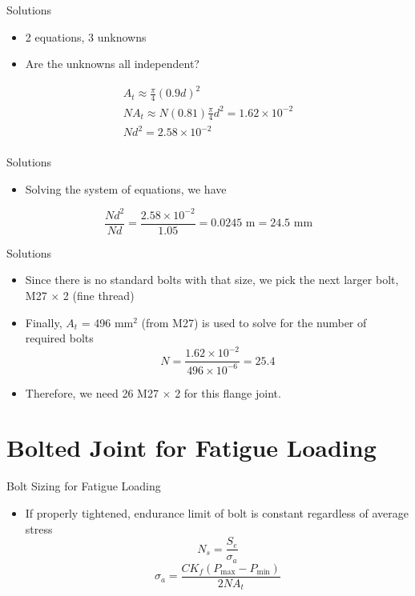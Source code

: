\documentclass[10pt, svgnames]{beamer}
\begin{document}
\begin{frame}[label={sec:org733d4e7}]{Solutions}
\begin{itemize}
  \item 2 equations, 3 unknowns
  \item Are the unknowns all independent?
  \end{itemize}
\[\begin{gathered}
    A_t \approx \frac{\pi}{4}\left(0.9d\right)^{2} \\
  NA_t \approx N(0.81)\frac{\pi}{4}{d^2} = 1.62 \times {10^{ - 2}} \\
  Nd^2 = 2.58 \times 10^{ - 2} \\
\end{gathered} \]
\end{frame}

\begin{frame}[label={sec:orge95eebf}]{Solutions}
\begin{itemize}
  \item Solving the system of equations, we have
\end{itemize}
\[\frac{Nd^2}{Nd} = \frac{2.58 \times 10^{-2}}{1.05} = 0.0245 \text{ m} = 24.5 \text{ mm} \]
\end{frame}

\begin{frame}[label={sec:org6852b98}]{Solutions}
\begin{itemize}
  \item Since there is no standard bolts with that size, we pick the next larger bolt, M27 $\times$ 2 (fine thread)
  \item Finally, $A_t$ = 496 mm$^2$ (from M27) is used to solve for the number of required bolts
        \[N = \frac{{1.62 \times {{10}^{ - 2}}}}{{496 \times {{10}^{ - 6}}}} = 25.4\]
  \item Therefore, we need 26 M27 $\times$ 2 for this flange joint.
\end{itemize}
\end{frame}

\section{Bolted Joint for Fatigue Loading}
\label{sec:org35eddb0}

\begin{frame}[label={sec:org3925696}]{Bolt Sizing for Fatigue Loading}
\begin{itemize}
\item If properly tightened, endurance limit of bolt is constant regardless of average stress
   $$ N_s = \frac{S_e}{\sigma_a} $$
   $$ \sigma_a = \frac{C K_f (P_{\max} - P_{\min})}{2NA_t} $$
\end{itemize}
\end{frame}
\end{document}
